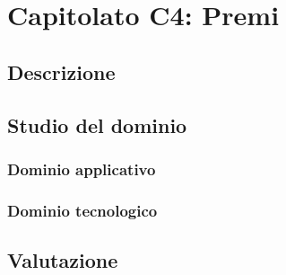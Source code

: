 %


\section{Capitolato C4: Premi}

\subsection{Descrizione}

\subsection{Studio del dominio}
\subsubsection{Dominio applicativo}
\subsubsection{Dominio tecnologico}

\subsection{Valutazione}